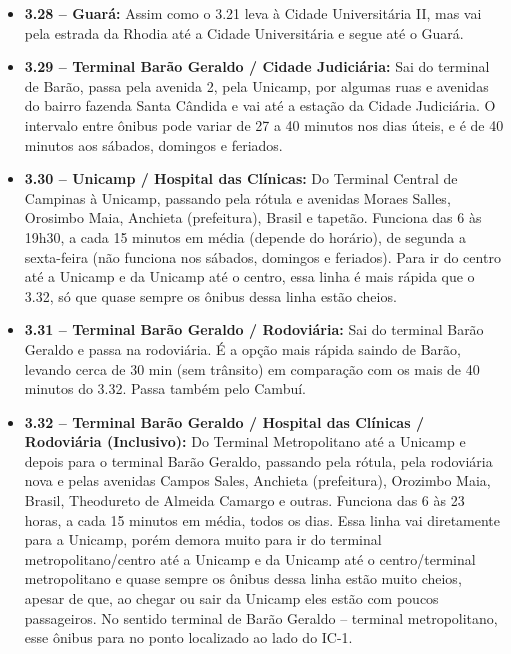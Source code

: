 \begin{itemize}
    \item  \textbf{3.28 -- Guará:} Assim como o 3.21 leva à Cidade Universitária
        II, mas vai pela estrada da Rhodia até a Cidade Universitária e segue
        até o Guará.

    \item  \textbf{3.29 -- Terminal Barão Geraldo / Cidade Judiciária:} Sai do
        terminal de Barão, passa pela avenida 2, pela Unicamp, por algumas ruas
        e avenidas do bairro fazenda Santa Cândida e vai até a estação da Cidade
        Judiciária. O intervalo entre ônibus pode variar de 27 a 40 minutos nos
        dias úteis, e é de 40 minutos aos sábados, domingos e feriados.

    \item  \textbf{3.30 -- Unicamp / Hospital das Clínicas:} Do Terminal Central
        de Campinas à Unicamp, passando pela rótula e avenidas Moraes Salles,
        Orosimbo Maia, Anchieta (prefeitura), Brasil e tapetão. Funciona das 6
        às 19h30, a cada 15 minutos em média (depende do horário), de segunda a
        sexta-feira (não funciona nos sábados, domingos e feriados). Para ir do
        centro até a Unicamp e da Unicamp até o centro, essa linha é mais rápida
        que o 3.32, só que quase sempre os ônibus dessa linha estão cheios.

    \item  \textbf{3.31 -- Terminal Barão Geraldo / Rodoviária:} Sai do terminal
        Barão Geraldo e passa na rodoviária. É a opção mais rápida saindo de
        Barão, levando cerca de 30 min (sem trânsito) em comparação com os mais
        de 40 minutos do 3.32. Passa também pelo Cambuí.

    \item  \textbf{3.32 -- Terminal Barão Geraldo / Hospital das Clínicas /
        Rodoviária (Inclusivo):} Do Terminal Metropolitano até a Unicamp e
        depois para o terminal Barão Geraldo, passando pela rótula, pela
        rodoviária nova e pelas avenidas Campos Sales, Anchieta (prefeitura),
        Orozimbo Maia, Brasil, Theodureto de Almeida Camargo e outras. Funciona
        das 6 às 23 horas, a cada 15 minutos em média, todos os dias. Essa linha
        vai diretamente para a Unicamp, porém demora muito para ir do terminal
        metropolitano/centro até a Unicamp e da Unicamp até o centro/terminal
        metropolitano e quase sempre os ônibus dessa linha estão muito cheios,
        apesar de que, ao chegar ou sair da Unicamp eles estão com poucos
        passageiros. No sentido terminal de Barão Geraldo -- terminal
        metropolitano, esse ônibus para no ponto localizado ao lado do IC-1.


\end{itemize}
